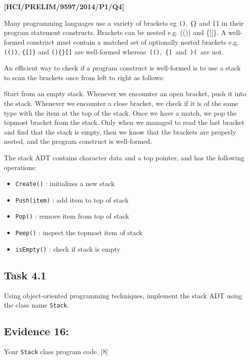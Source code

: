 \item \textbf{{[}HCI/PRELIM/9597/2014/P1/Q4{]} }

Many programming languages use a variety of brackets eg \texttt{()},
\texttt{\{\}} and \texttt{{[}{]}} in their program statement constructs.
Brackets can be nested e.g. (()) and \{{[}{]}\}. A well-formed construct
must contain a matched set of optionally nested brackets e.g.\texttt{ (())},
\texttt{\{{[}{]}\}} and \texttt{()\{\}{[}{]}} are well-formed whereas\texttt{
(()},\texttt{ \{{]} }and\texttt{ )( }are not. 

An efficient way to check if a program construct is well-formed is
to use a stack to scan the brackets once from left to right as follows: 

Start from an empty stack. Whenever we encounter an open bracket,
push it into the stack. Whenever we encounter a close bracket, we
check if it is of the same type with the item at the top of the stack.
Once we have a match, we pop the topmost bracket from the stack. Only
when we managed to read the last bracket and find that the stack is
empty, then we know that the brackets are properly nested, and the
program construct is well-formed. 

The stack ADT contains character data and a top pointer, and has the
following operations: 
\begin{itemize}
\item \texttt{Create()} : initializes a new stack 
\item \texttt{Push(item)} : add item to top of stack 
\item \texttt{Pop()} : remove item from top of stack 
\item \texttt{Peep()} : inspect the topmost item of stack 
\item \texttt{isEmpty()} : check if stack is empty 
\end{itemize}

\subsection*{Task 4.1 }

Using object-oriented programming techniques, implement the stack
ADT using the class name \texttt{Stack}. 

\subsection*{Evidence 16: }

Your \texttt{Stack} class program code. \hfill{}{[}8{]}

